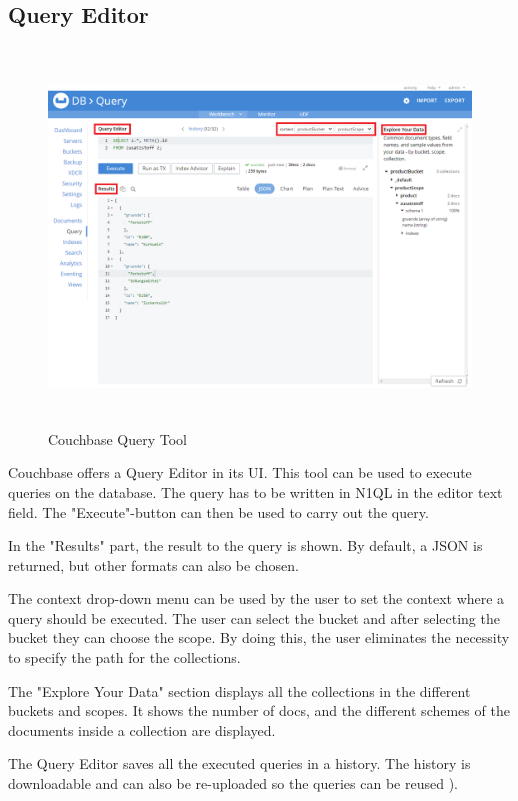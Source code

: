 \subsection{Query Editor}

\begin{figure}[H]
    \centering
        \includegraphics[height=10cm]{images/Query_Tool_Couchbase_marked.png}
    \caption{Couchbase Query Tool}
    \label{fig:CouchbaseQueryTool}
\end{figure}

Couchbase offers a Query Editor in its \ac{UI}. This tool can be used to execute queries on the database. The query has to be written in \ac{N1QL} in the editor text field. The "Execute"-button can then be used to carry out the query.

In the "Results" part, the result to the query is shown. By default, a \ac{JSON} is returned, but other formats can also be chosen. 

The context drop-down menu can be used by the user to set the context where a query should be executed. The user can select the bucket and after selecting the bucket they can choose the scope. By doing this, the user eliminates the necessity to specify the path for the collections.

The "Explore Your Data" section displays all the collections in the different buckets and scopes. It shows the number of docs, and the different schemes of the documents inside a collection are displayed.

The Query Editor saves all the executed queries in a history. The history is downloadable and can also be re-uploaded so the queries can be reused \parencite{Couchbase.20230325}).


